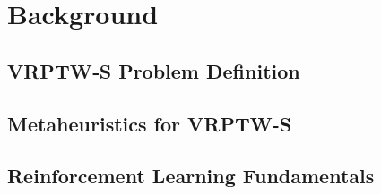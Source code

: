 \documentclass[final,11pt,times]{elsarticle}
\begin{document}



\section{Background}
\label{sec:background}

\subsection{VRPTW‑S Problem Definition}


\subsection{Metaheuristics for VRPTW-S}


\subsection{Reinforcement Learning Fundamentals}
\end{document}
